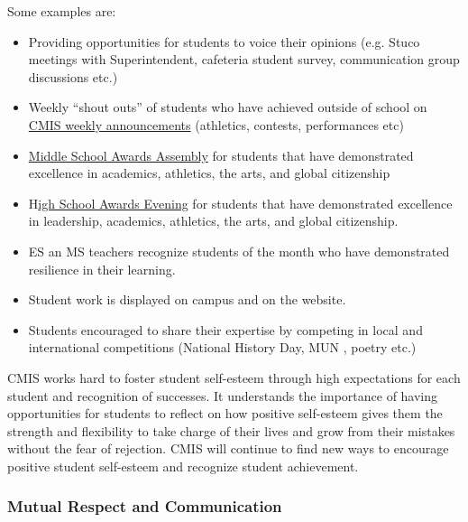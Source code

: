 \begin{findings}
Some examples are:
\begin{itemize}
\item Providing opportunities for students to voice their opinions (e.g. Stuco meetings with Superintendent, cafeteria student survey, communication group discussions etc.)
\item Weekly “shout outs” of students who have achieved outside of school on \href{http://blogs.cmis.ac.th/eagles/friday-september-16-2016/}{CMIS weekly announcements} (athletics, contests, performances etc)
\item\href{https://docs.google.com/a/cmis.ac.th/document/d/1DgY3NXB6m6qvmWnaRr2B2jswCGHRjaPFNPJA2Xzk1qw/edit?usp=sharing}{ Middle School Awards Assembly} for students that have demonstrated excellence in academics, athletics, the arts, and global citizenship
\item H\href{https://docs.google.com/document/d/1pxioSUeOgKZ4dT1jA9DiVzDjZjtrxuM-Gjqh7fRy0Us/edit?usp=sharing}{igh School Awards Evening} for students that have demonstrated excellence in leadership, academics, athletics, the arts, and global  citizenship.
\item ES an MS teachers recognize students of the month who have demonstrated resilience in their learning.
\item Student work is displayed on campus and on the website. 
\item Students encouraged to share their expertise by competing in local and international competitions (National History Day, MUN , poetry  etc.)
\end{itemize}


CMIS works hard to foster student self-esteem through high expectations for each student and recognition of successes. It understands the importance of having opportunities for students to reflect on how positive self-esteem gives them the strength and flexibility to take charge of their lives and grow from their mistakes without the fear of rejection. CMIS will continue to find new ways to encourage positive student self-esteem and recognize student achievement. 
\end{findings}

\subsubsection{Mutual Respect and Communication}



